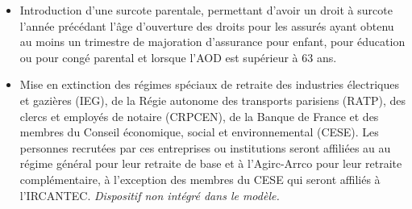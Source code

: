 \begin{itemize}
	\item Introduction d'une surcote parentale, permettant d'avoir un droit à surcote l'année précédant l'âge d'ouverture des droits pour les assurés ayant obtenu au moins un trimestre de majoration d'assurance pour enfant, pour éducation ou pour congé parental et lorsque l'AOD est supérieur à 63 ans.
	\item Mise en extinction des régimes spéciaux de retraite des industries électriques et gazières (IEG), de la Régie autonome des transports parisiens (RATP), des clercs et employés de notaire (CRPCEN), de la Banque de France et des membres du Conseil économique, social et environnemental (CESE). Les personnes recrutées par ces entreprises ou institutions seront affiliées au au régime général pour leur retraite de base et à l’Agirc-Arrco pour leur retraite complémentaire, à l’exception des membres du CESE qui seront affiliés à l’IRCANTEC. \textit{Dispositif non intégré dans le modèle.}
\end{itemize}


